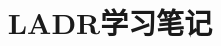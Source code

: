 \documentclass[b5paper]{ctexrep}
\author{\Large \Caffein}
\begin{document}
\title{LADR学习笔记}
\date{}
\maketitle
\tableofcontents






\end{document}
